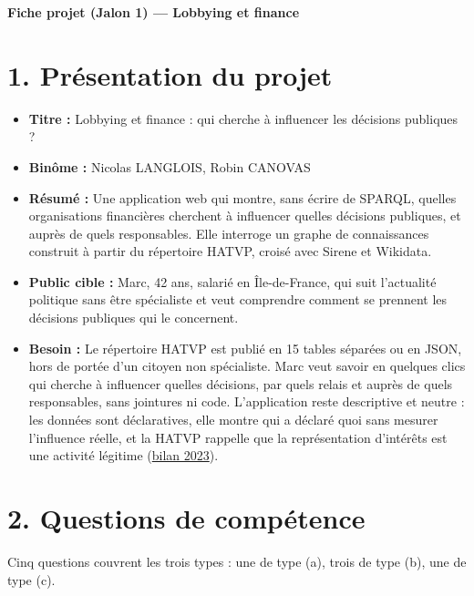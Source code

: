 \documentclass[11pt,a4paper]{article}
\begin{document}
\begin{center}
  {\Large\bfseries Fiche projet (Jalon 1) --- Lobbying et finance}
\end{center}

\section*{1. Présentation du projet}

\begin{itemize}
  \item \textbf{Titre :} Lobbying et finance : qui cherche à influencer les décisions publiques ?
  \item \textbf{Binôme :} Nicolas LANGLOIS, Robin CANOVAS
  \item \textbf{Résumé :} Une application web qui montre, sans écrire de SPARQL, quelles organisations financières cherchent à influencer quelles décisions publiques, et auprès de quels responsables. Elle interroge un graphe de connaissances construit à partir du répertoire HATVP, croisé avec Sirene et Wikidata.
  \item \textbf{Public cible :} Marc, 42 ans, salarié en Île-de-France, qui suit l'actualité politique sans être spécialiste et veut comprendre comment se prennent les décisions publiques qui le concernent.
  \item \textbf{Besoin :} Le répertoire HATVP est publié en 15 tables séparées ou en JSON, hors de portée d'un citoyen non spécialiste. Marc veut savoir en quelques clics qui cherche à influencer quelles décisions, par quels relais et auprès de quels responsables, sans jointures ni code. L'application reste descriptive et neutre : les données sont déclaratives, elle montre qui a déclaré quoi sans mesurer l'influence réelle, et la HATVP rappelle que la représentation d'intérêts est une activité légitime (\href{https://www.hatvp.fr/wordpress/wp-content/uploads/2024/07/HATVP_BILAN_RRI-2023_VF.pdf}{bilan 2023}).
\end{itemize}

\section*{2. Questions de compétence}

Cinq questions couvrent les trois types : une de type (a), trois de type (b), une de type (c).
\end{document}
